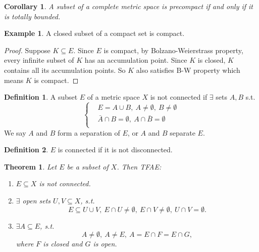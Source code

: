 \documentclass[12pt]{article}
\theoremstyle{plain}
\newtheorem{thm}{Theorem}
\newtheorem*{corollary}{Corollary}
\theoremstyle{definition}
\newtheorem*{defn}{Definition}
\newtheorem*{eg}{Example}
\begin{document}
\begin{corollary}
    A subset of a complete metric space is precompact if and only if it is
    totally bounded.
\end{corollary}

\begin{eg}
    A closed subset of a compact set is compact.
    \begin{proof}
        Suppose $K\subseteq E$. Since $E$ is compact, by Bolzano-Weierstrass
        property, every infinite subset of $K$ has an accumulation point.
        Since $K$ is closed, $K$ contains all its accumulation points.
        So $K$ also satisfies B-W property which means $K$ is compact.
    \end{proof}
\end{eg}

\begin{defn}
    A subset $E$ of a metric space $X$ is not connected if $\exists$ sets $A, B$
    s.t.
    $$\left\{
        \begin{aligned}
            &E=A\cup B,\ A\neq\emptyset,\ B\neq\emptyset\\
            &\bar{A}\cap B=\emptyset,\ A\cap\bar{B}=\emptyset\\
        \end{aligned}
    \right.$$
    We say $A$ and $B$ form a separation of $E$, or $A$ and $B$ separate $E$.
\end{defn}

\begin{defn}
    $E$ is connected if it is not disconnected.
\end{defn}

\begin{thm}\label{thm:3}
    Let $E$ be a subset of $X$. Then TFAE:
    \begin{enumerate}
        \item $E\subseteq X$ is not connected.
        \item $\exists$ open sets $U,V\subseteq X$, s.t.
            $$E\subseteq U\cup V,\ E\cap U\neq\emptyset,\ E\cap V\neq\emptyset,\
            U\cap V=\emptyset.$$
        \item $\exists A\subseteq E$, s.t.
            $$A\neq\emptyset,\ A\neq E,\ A=E\cap F=E\cap G,$$
            where $F$ is closed and $G$ is open.
    \end{enumerate}
\end{thm}
\end{document}

